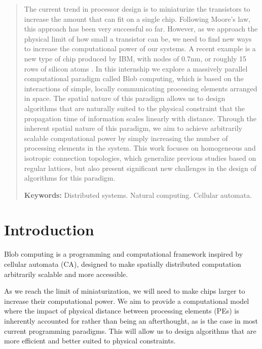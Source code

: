 \documentclass[11pt,a4paper]{report}
\begin{document}
\begin{abstract}

The current trend in processor design is to miniaturize the transistors to increase the amount that can fit on a single chip. Following Moore's law, this approach has been very successful so far. However, as we approach the physical limit of how small a transistor can be, we need to find new ways to increase the computational power of our systems. A recent example is a new type of chip produced by IBM, with nodes of 0.7nm, or roughly 15 rows of silicon atoms \cite{ibm}. In this internship we explore a massively parallel computational paradigm called Blob computing, which is based on the interactions of simple, locally communicating processing elements arranged in space. The spatial nature of this paradigm allows us to design algorithms that are naturally suited to the physical constraint that the propagation time of information scales linearly with distance. Through the inherent spatial nature of this paradigm, we aim to achieve arbitrarily scalable computational power by simply increasing the number of processing elements in the system. This work focuses on homogeneous and isotropic connection topologies, which generalize previous studies based on regular lattices, but also present significant new challenges in the design of algorithms for this paradigm.

\vspace{2cm}
\noindent \textbf{Keywords:} Distributed systems. Natural computing. Cellular automata.

\end{abstract}

\tableofcontents
\glsaddall
\printglossary[type=\acronymtype]
\printglossary[type=main,title={Glossary},toctitle={Glossary}]

\chapter{Introduction}

Blob computing is a programming and computational framework inspired by cellular automata (CA), designed to make spatially distributed computation arbitrarily scalable and more accessible. 

As we reach the limit of miniaturization, we will need to make chips larger to increase their computational power. We aim to provide a computational model where the impact of physical distance between processing elements (PEs) is inherently accounted for rather than being an afterthought, as is the case in most current programming paradigms. This will allow us to design algorithms that are more efficient and better suited to physical constraints.
\end{document}
